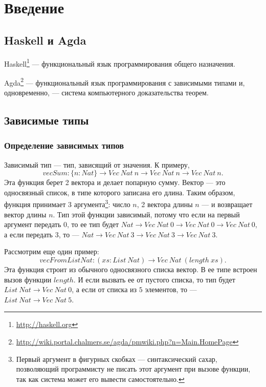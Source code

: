 \section{Введение}

\subsection{Haskell и Agda}

Haskell\footnote{\url{http://haskell.org}} --- функциональный язык программирования
общего назначения.

Agda\footnote{\url{http://wiki.portal.chalmers.se/agda/pmwiki.php?n=Main.HomePage}} ---
функциональный язык программирования с зависимыми типами и, одновременно, ---
система компьютерного доказательства теорем.

\subsection{Зависимые типы}

\subsubsection{Определение зависимых типов}

Зависимый тип --- тип, зависящий от значения. К примеру,
\[
vecSum : \{n : Nat\} \rightarrow Vec\ Nat\ n \rightarrow Vec\ Nat\ n \rightarrow Vec\ Nat\ n.
\]
Эта функция берет 2 вектора и делает попарную сумму.
Вектор --- это односвязный список, в типе которого записана его длина.
Таким образом, функция принимает 3 аргумента\footnote{
Первый аргумент в фигурных скобках --- синтаксический сахар, позволяющий программисту
не писать этот аргумент при вызове функции, так как система может его вывести самостоятельно.}:
число \(n\), 2 вектора длины \(n\) --- и возвращает вектор длины \(n\). Тип этой функции зависимый,
потому что если на первый аргумент передать \(0\), то ее тип будет
\(Nat \rightarrow Vec\ Nat\ 0 \rightarrow Vec\ Nat\ 0 \rightarrow Vec\ Nat\ 0\), а если передать \(3\), то ---
\(Nat \rightarrow Vec\ Nat\ 3 \rightarrow Vec\ Nat\ 3 \rightarrow Vec\ Nat\ 3\).

Рассмотрим еще один пример:
\[
vecFromListNat : (xs : List\ Nat) \rightarrow Vec\ Nat\ (length\ xs).
\]
Эта функция строит из обычного односвязного списка вектор. В ее типе встроен вызов
функции \(length\). И если вызвать ее от пустого списка, то тип будет
\(List\ Nat \rightarrow Vec\ Nat\ 0\), а если от списка из \(5\) элементов, то ---
\(List\ Nat \rightarrow Vec\ Nat\ 5\).

